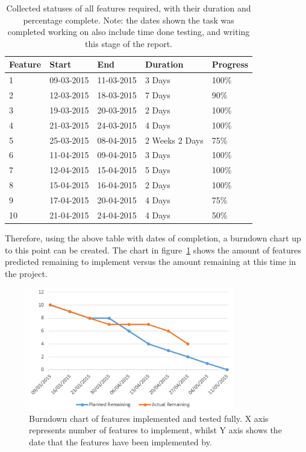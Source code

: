\begin{table}[h]
\centering
 \label{tbl:features}
\begin{tabular}{|l|l|l|l|l|}
\hline
\textbf{Feature} & \textbf{Start} & \textbf{End} & \textbf{Duration} & \textbf{Progress}                                                                                                \\ \hline
1 & 09-03-2015     & 11-03-2015   & 3 Days            & 100\%\\ \hline
2 & 12-03-2015     & 18-03-2015   & 7 Days            & 90\%\\ \hline
3 & 19-03-2015     & 20-03-2015   & 2 Days            & 100\% \\ \hline
4 & 21-03-2015     & 24-03-2015   & 4 Days            & 100\%\\ \hline
5 & 25-03-2015     & 08-04-2015   & 2 Weeks 2 Days    & 75\% \\ \hline
6 & 11-04-2015     & 09-04-2015   & 3 Days            & 100\% \\ \hline
7 & 12-04-2015     & 15-04-2015   & 5 Days            & 100\% \\ \hline
8 & 15-04-2015     & 16-04-2015   & 2 Days            & 100\% \\ \hline
9 & 17-04-2015     & 20-04-2015   & 4 Days            & 75\% \\ \hline
10 & 21-04-2015     & 24-04-2015   & 4 Days            & 50\% \\ \hline
\end{tabular}
\caption{Collected statuses of all features required, with their duration and percentage complete. Note: the dates shown the task was completed working on also include time done testing, and writing this stage of the report.}
\end{table}

Therefore, using the above table with dates of completion, a burndown chart up to this point can be created. The chart in figure~\ref{fig:burndown} shows the amount of features predicted remaining to implement versus the amount remaining at this time in the project. 

\begin{figure}[h]
  \centering
      \includegraphics[width=0.8\textwidth]{images/burndown.png}
  \caption{Burndown chart of features implemented and tested fully. X axis represents number of features to implement, whilst Y axis shows the date that the features have been implemented by.}
  \label{fig:burndown}
\end{figure}

